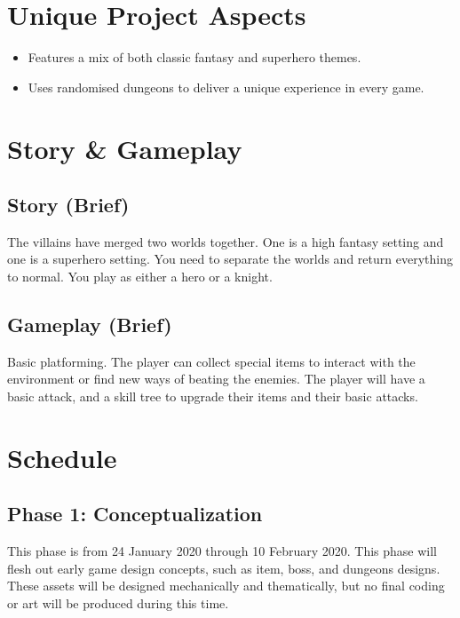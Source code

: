 \documentclass[titlepage]{article}
\begin{document}
\section{Unique Project Aspects}
\begin{itemize}
	\item Features a mix of both classic fantasy and superhero themes.
	\item Uses randomised dungeons to deliver a unique experience in every game.
\end{itemize}

\section{Story \& Gameplay}
\subsection*{Story (Brief)}
The villains have merged two worlds together. One is a high fantasy setting and
one is a superhero setting. You need to separate the worlds and return
everything to normal. You play as either a hero or a knight. 

\subsection*{Gameplay (Brief)}
Basic platforming. The player can collect special items to interact with the
environment or find new ways of beating the enemies. The player will have a
basic attack, and a skill tree to upgrade their items and their basic attacks. 

\section{Schedule}

\subsection*{Phase 1: Conceptualization}

This phase is from 24 January 2020 through 10 February 2020. This phase will
flesh out early game design concepts, such as item, boss, and dungeons designs.
These assets will be designed mechanically and thematically, but no final coding
or art will be produced during this time.
\end{document}
